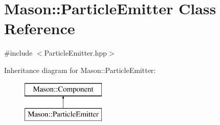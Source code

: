 \hypertarget{class_mason_1_1_particle_emitter}{}\section{Mason\+:\+:Particle\+Emitter Class Reference}
\label{class_mason_1_1_particle_emitter}


{\ttfamily \#include $<$Particle\+Emitter.\+hpp$>$}

Inheritance diagram for Mason\+:\+:Particle\+Emitter\+:\begin{figure}[H]
\begin{center}
\leavevmode
\includegraphics[height=2.000000cm]{class_mason_1_1_particle_emitter}
\end{center}
\end{figure}
